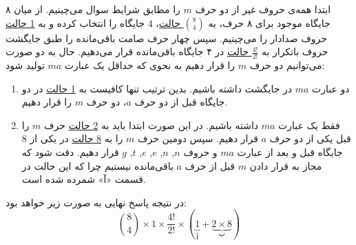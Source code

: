 \p
ابتدا همه‌ی حروف غیر از دو حرف $m$ را مطابق شرایط سوال می‌چینیم.
از میان ۸ جایگاه موجود برای ۸ حرف، به 
\underline{${8\choose 4}$ حالت}، 
4
جایگاه را انتخاب کرده و به
\underline{1 حالت}
حروف صدادار را می‌چینیم.
سپس چهار حرف صامت باقی‌مانده
را طبق جایگشت حروف باتکرار به
 \underline{$\frac{4!}{2!}$ حالت}
در ۴ جایگاه باقی‌مانده قرار می‌دهیم.
حال به دو صورت می‌توانیم دو حرف $m$ را قرار دهیم به نحوی که حداقل یک عبارت 
$ma$ تولید شود:
\begin{enumerate}
  \item 
  دو عبارت  $ma$  در جایگشت داشته باشیم.
   بدین ترتیب تنها کافیست به 
  \underline{1 حالت}
   در دو جایگاه قبل از دو حرف 
   $a$،  
   دو حرف 
   $m$ را قرار دهیم.

  \item
  فقط یک عبارت $ma$ داشته‌ باشیم. 
  در این صورت ابتدا باید به
  \underline{2 حالت}
  حرف 
  $m$ 
  را قبل یکی از دو حرف 
  $a$ 
  قرار دهیم. 
  سپس
   دومین حرف
  $m$
  را
  به
  \underline{8 حالت}
  در یکی از 8 جایگاه قبل و بعد از عبارت 
  $ma$
   و حروف 
   $n$, 
   $n$, 
   $e$, 
   $e$, 
   $t$, 
   $g$ 
   قرار دهیم.
   دقت شود که مجاز به قرار دادن 
  $m$
  قبل از حرف 
  $a$ 
  باقی‌مانده 
  نیستیم چرا که این حالت در قسمت «آ» شمرده شده است.
\end{enumerate}
\p
در نتیجه پاسخ نهایی به صورت زیر خواهد بود:
$${8\choose 4} \times 1 \times \frac{4!}{2!} \times (\underbrace{1}_{\text{آ}} + \underbrace{2 \times 8}_{\text{ب}})$$